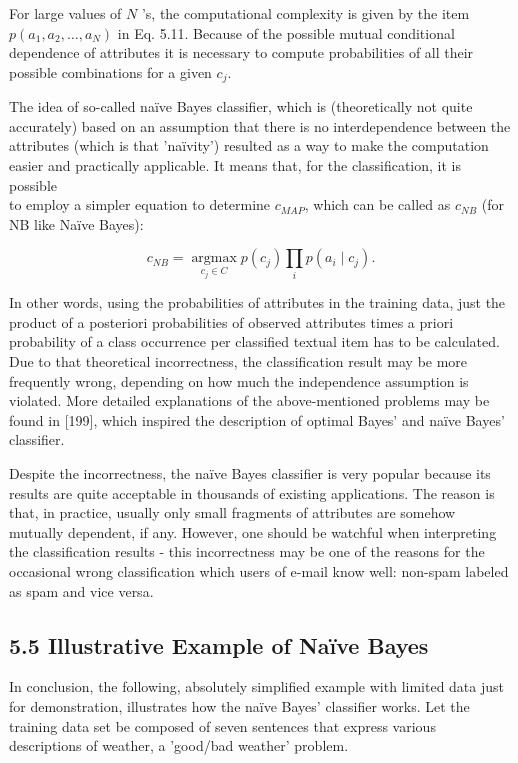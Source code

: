 \documentclass[10pt]{book}
\begin{document}
For large values of $N$ 's, the computational complexity is given by the item $p\left(a_{1}, a_{2}, \ldots, a_{N}\right)$ in Eq. 5.11. Because of the possible mutual conditional dependence of attributes it is necessary to compute probabilities of all their possible combinations for a given $c_{j}$.

The idea of so-called naïve Bayes classifier, which is (theoretically not quite accurately) based on an assumption that there is no interdependence between the attributes (which is that 'naïvity') resulted as a way to make the computation easier and practically applicable. It means that, for the classification, it is possible\\
to employ a simpler equation to determine $c_{M A P}$, which can be called as $c_{N B}$ (for NB like Naïve Bayes):


\begin{equation*}
c_{N B}=\underset{c_{j} \in C}{\operatorname{argmax}} p\left(c_{j}\right) \prod_{i} p\left(a_{i} \mid c_{j}\right) . \tag{5.12}
\end{equation*}


In other words, using the probabilities of attributes in the training data, just the product of a posteriori probabilities of observed attributes times a priori probability of a class occurrence per classified textual item has to be calculated. Due to that theoretical incorrectness, the classification result may be more frequently wrong, depending on how much the independence assumption is violated. More detailed explanations of the above-mentioned problems may be found in [199], which inspired the description of optimal Bayes' and naïve Bayes' classifier.

Despite the incorrectness, the naïve Bayes classifier is very popular because its results are quite acceptable in thousands of existing applications. The reason is that, in practice, usually only small fragments of attributes are somehow mutually dependent, if any. However, one should be watchful when interpreting the classification results - this incorrectness may be one of the reasons for the occasional wrong classification which users of e-mail know well: non-spam labeled as spam and vice versa.

\subsection*{5.5 Illustrative Example of Naïve Bayes}
In conclusion, the following, absolutely simplified example with limited data just for demonstration, illustrates how the naïve Bayes' classifier works. Let the training data set be composed of seven sentences that express various descriptions of weather, a 'good/bad weather' problem.
\end{document}
